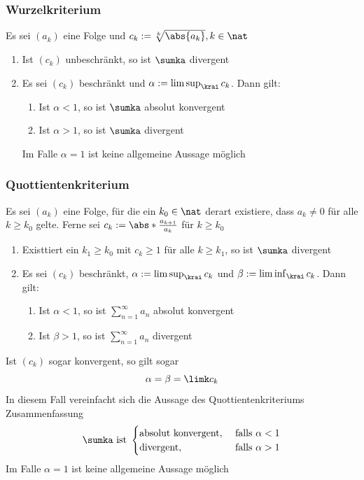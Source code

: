 \documentclass{kit}
\begin{document}
    \subsubsection{Wurzelkriterium}
    Es sei $(a_k)$ eine Folge und $c_k:=\sqrt[k]{\abs{a_k}},k\in\nat$
      \begin{enumerate}
        \item Ist $(c_k)$ unbeschränkt, so ist $\sumka$ divergent
        \item Es sei $(c_k)$ beschränkt und $\alpha:=\limsup_\krai c_k$. Dann gilt:
          \begin{enumerate}[label=\roman*)]
            \item Ist $\alpha<1$, so ist $\sumka$ absolut konvergent
            \item Ist $\alpha>1$, so ist $\sumka$ divergent
          \end{enumerate}
          Im Falle $\alpha=1$ ist keine allgemeine Aussage möglich
      \end{enumerate}
    \subsubsection{Quottientenkriterium}
      Es sei $(a_k)$ eine Folge, für die ein $k_0\in\nat$ derart existiere, dass $a_k\neq0$ für alle $k\ge k_0$ gelte. Ferne sei $c_k:=\abs*{\frac{a_{k+1}}{a_k}}$ für $k\ge k_0$
      \begin{enumerate}
        \item Existtiert ein $k_1\ge k_0$ mit $c_k\ge1$ für alle $k\ge k_1$, so ist $\sumka$ divergent
        \item Es sei $(c_k)$ beschränkt, $\alpha:=\limsup_\krai c_k$ und $\beta:=\liminf_\krai c_k$. Dann gilt:
          \begin{enumerate}[label=\roman*)]
            \item Ist $\alpha<1$, so ist $\sum^\infty_{n=1}a_n$ absolut konvergent
            \item Ist $\beta>1$, so ist $\sum^\infty_{n=1}a_n$ divergent
          \end{enumerate}
      \end{enumerate}
      Ist $(c_k)$ sogar konvergent, so gilt sogar
      $$\alpha=\beta=\limk c_k$$
      In diesem Fall vereinfacht sich die Aussage des Quottientenkriteriums Zusammenfassung
      $$\sumka \text{ ist }\begin{cases}
      \text{absolut konvergent}, & \text{ falls }\alpha<1\\
      \text{divergent}, & \text{ falls } \alpha>1
      \end{cases}$$
      Im Falle $\alpha=1$ ist keine allgemeine Aussage möglich
\end{document}
